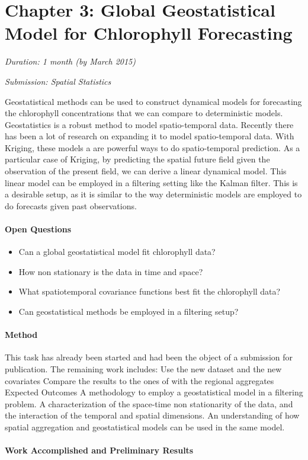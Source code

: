 \section{Chapter 3: Global Geostatistical Model for Chlorophyll Forecasting}

\noindent
\emph{Duration: 1 month (by March 2015)}

\noindent
\emph{Submission: Spatial Statistics}

Geostatistical methods can be used to construct dynamical models for forecasting the chlorophyll concentrations that we can compare to deterministic models. Geostatistics is a robust method to model spatio-temporal data. Recently there has been a lot of research on expanding it to model spatio-temporal data. With Kriging, these models a are powerful ways to do spatio-temporal prediction. As a particular case of Kriging, by predicting the spatial future field given the observation of the present field, we can derive a linear dynamical model. This linear model can be employed in a filtering setting like the Kalman filter. This is a desirable setup, as it is similar to the way deterministic models are employed to do forecasts given past observations. 

\paragraph{Open Questions}

\begin{itemize}
\item Can a global geostatistical model fit chlorophyll data?
\item How non stationary is the data in time and space?
\item What spatiotemporal covariance functions best fit the chlorophyll data?
\item Can geostatistical methods be employed in a filtering setup?
\end{itemize}

\paragraph{Method}

This task has already been started and had been the object of a submission for publication. The remaining work includes:
Use the new dataset and the new covariates
Compare the results to the ones of with the regional aggregates
Expected Outcomes
A methodology to employ a geostatistical model in a filtering problem.
A characterization of the space-time non stationarity of the data, and the interaction of the temporal and spatial dimensions.
An understanding of how spatial aggregation and geostatistical models can be used in the same model. 

\paragraph{Work Accomplished and Preliminary Results}


